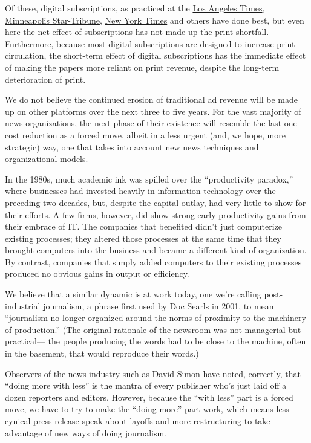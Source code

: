 Of these, digital subscriptions, as practiced at the \href{http://www.latimes.com/}{Los Angeles Times}, \href{http://www.startribune.com/}{Minneapolis
Star-Tribune}, \href{http://www.nytimes.com/}{New York Times} and others have done best, but even here
the net effect of subscriptions has not made up the print shortfall. Furthermore,
because most digital subscriptions are designed to increase print circulation, the
short-term effect of digital subscriptions has the immediate effect of making
the papers more reliant on print revenue, despite the long-term deterioration
of print.

We do not believe the continued erosion of traditional ad revenue will be made
up on other platforms over the next three to five years. For the vast majority
of news organizations, the next phase of their existence will resemble the last
one—cost reduction as a forced move, albeit in a less urgent (and, we hope,
more strategic) way, one that takes into account new news techniques and
organizational models.

In the 1980s, much academic ink was spilled over the ``productivity paradox,''
where businesses had invested heavily in information technology over the preceding
two decades, but, despite the capital outlay, had very little to show for
their efforts. A few firms, however, did show strong early productivity gains from
their embrace of IT. The companies that benefited didn’t just computerize existing
processes; they altered those processes at the same time that they brought
computers into the business and became a different kind of organization. By
contrast, companies that simply added computers to their existing processes produced
no obvious gains in output or efficiency.

We believe that a similar dynamic is at work today, one we’re calling post-industrial
journalism, a phrase first used by Doc Searls in 2001, to mean ``journalism
no longer organized around the norms of proximity to the machinery of production.''
(The original rationale of the newsroom was not managerial but practical—
the people producing the words had to be close to the machine, often in the
basement, that would reproduce their words.)

Observers of the news industry such as David Simon have noted, correctly, that
``doing more with less'' is the mantra of every publisher who’s just laid off a
dozen reporters and editors. However, because the ``with less'' part is a forced
move, we have to try to make the ``doing more'' part work, which means less
cynical press-release-speak about layoffs and more restructuring to take advantage
of new ways of doing journalism.

